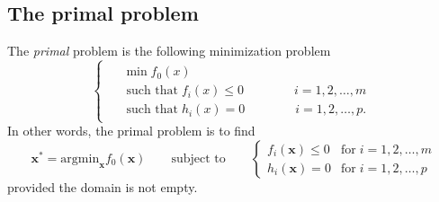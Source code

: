 \subsection{The primal problem}
 The \emph{primal} problem is the following minimization problem
\begin{equation*}
\begin{cases}
    \begin{aligned}
        & \min f_0(x) \\
        & \;\text{such that}\; f_i(x)\leq 0 \qquad\qquad i=1,2,\ldots, m\\
        & \;\text{such that}\; h_i(x)= 0 \qquad\qquad i=1,2,\ldots, p.
    \end{aligned}
\end{cases}
\end{equation*}
In other words, the primal problem is to find
\begin{equation*}
    \mathbf{x}^* = \mathrm{argmin}_{\mathbf{x}} f_0(\mathbf{x}) \qquad\text{subject to}\qquad 
    \begin{cases}
        f_i(\mathbf{x}) \leq 0 &\text{for}\;i=1,2,\ldots , m\\
        h_i(\mathbf{x}) = 0 &\text{for}\;i=1,2,\ldots , p
    \end{cases}
\end{equation*}
provided the domain is not empty.
\medskip

